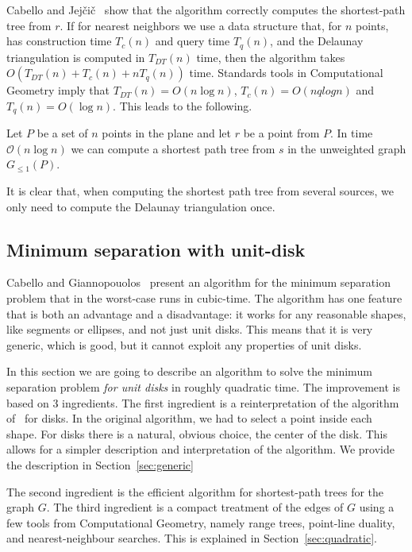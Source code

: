 \documentclass[a4paper,USenglish,numberwithinsect]{lipics}
\newcommand{\GG}{\ensuremath{G_{\le 1}}}
\let\le\leqslant
\begin{document}
Cabello and Jej\v{c}i\v{c}~\cite{CJ15} show that the algorithm correctly computes
the shortest-path tree from $r$. 
If for nearest neighbors we use a data structure that,
for $n$ points, has construction time $T_c(n)$ and query time $T_q(n)$, 
and the Delaunay triangulation is computed in $T_{DT}(n)$ time,
then the algorithm takes $O(T_{DT}(n)+ T_c(n)+ n T_q(n))$ time. 
Standards tools in Computational Geometry imply that 
$T_{DT}(n)=O(n\log n)$, $T_c(n)=O(nqlog n)$ and $T_q(n)=O(\log n)$.
This leads to the following.

\begin{theorem}
  Let $P$ be a set of $n$ points in the plane and let $r$ be a point from $P$. 
  In time ${\mathcal O}(n \log n)$ we can compute a shortest path tree from $s$
  in the unweighted graph $\GG(P)$.
\end{theorem}

It is clear that, when computing the shortest path tree from several sources,
we only need to compute the Delaunay triangulation once.

\subsection{Minimum separation with unit-disk}
\label{sec:algorithm-separation}

Cabello and Giannopouolos~\cite{CG16} present an algorithm
for the minimum separation problem that in the worst-case runs in cubic-time.
The algorithm has one feature that is both an advantage and a disadvantage: 
it works for any reasonable shapes, like segments or ellipses, and not just unit disks.
This means that it is very generic, which is good,
but it cannot exploit any properties of  unit disks.

In this section we are going to describe an algorithm to solve the minimum separation
problem \emph{for unit disks} in roughly quadratic time.
The improvement is based on 3 ingredients. 
The first ingredient is a reinterpretation of the algorithm of~\cite{CG16} 
for disks. In the original algorithm, we had to select a point inside each
shape. For disks there is a natural, obvious choice, the center of the disk.
This allows for a simpler description and interpretation of the algorithm.
We provide the description in Section~\ref{sec:generic}

The second ingredient is the efficient algorithm for shortest-path trees for the graph $G$.
The third ingredient is a compact treatment of the edges of $G$ using
a few tools from Computational Geometry, namely 
range trees, point-line duality, and nearest-neighbour searches.
This is explained in Section~\ref{sec:quadratic}.
\end{document}
